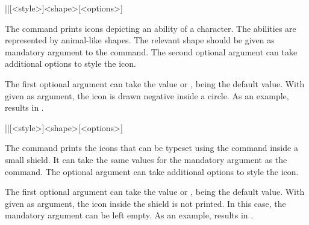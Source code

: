 \documentclass[a4paper]{article}
\begin{document}
\begin{macrodef}
|\ability|[<style>]{<shape>}[<options>]
\end{macrodef}
The command \macro{\ability} prints icons depicting an ability of a character. The abilities are represented by animal-like shapes. The relevant shape should be given as mandatory argument to the command. The second optional argument can take additional options to style the icon.

The first optional argument can take the value  or ,  being the default value. With  given as argument, the icon is drawn negative inside a circle. As an example,  results in .

\begin{macrodef}
|\saving|[<style>]{<shape>}[<options>]
\end{macrodef}
The command \macro{\saving} prints the icons that can be typeset using the \macro{\ability} command inside a small shield. It can take the same values for the mandatory argument as the \macro{\ability} command. The optional argument can take additional options to style the icon.

The first optional argument can take the value  or ,  being the default value. With  given as argument, the icon inside the shield is not printed. In this case, the mandatory argument can be left empty. As an example, \macro{\saving[empty]{}} results in \saving[empty]{}. 
\end{document}
